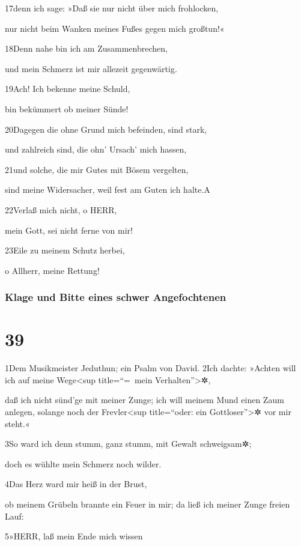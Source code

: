 17denn ich sage: »Daß sie nur nicht über mich frohlocken,

nur nicht beim Wanken meines Fußes gegen mich großtun!«

18Denn nahe bin ich am Zusammenbrechen,

und mein Schmerz ist mir allezeit gegenwärtig.

19Ach! Ich bekenne meine Schuld,

bin bekümmert ob meiner Sünde!

20Dagegen die ohne Grund mich befeinden, sind stark,

und zahlreich sind, die ohn' Ursach' mich hassen,

21und solche, die mir Gutes mit Bösem vergelten,

sind meine Widersacher, weil fest am Guten ich halte.{A}

22Verlaß mich nicht, o HERR,

mein Gott, sei nicht ferne von mir!

23Eile zu meinem Schutz herbei,

o Allherr, meine Rettung!

\hypertarget{klage-und-bitte-eines-schwer-angefochtenen}{%
\subsubsection{Klage und Bitte eines schwer
Angefochtenen}\label{klage-und-bitte-eines-schwer-angefochtenen}}

\hypertarget{section-38}{%
\section{39}\label{section-38}}

1Dem Musikmeister Jeduthun; ein Psalm von David. 2Ich dachte: »Achten
will ich auf meine Wege\textless sup title=``=~mein
Verhalten''\textgreater✲,

daß ich nicht sünd'ge mit meiner Zunge; ich will meinem Mund einen Zaum
anlegen, solange noch der Frevler\textless sup title=``oder: ein
Gottloser''\textgreater✲ vor mir steht.«

3So ward ich denn stumm, ganz stumm, mit Gewalt schweigsam✲;

doch es wühlte mein Schmerz noch wilder.

4Das Herz ward mir heiß in der Brust,

ob meinem Grübeln brannte ein Feuer in mir; da ließ ich meiner Zunge
freien Lauf:

5»HERR, laß mein Ende mich wissen

